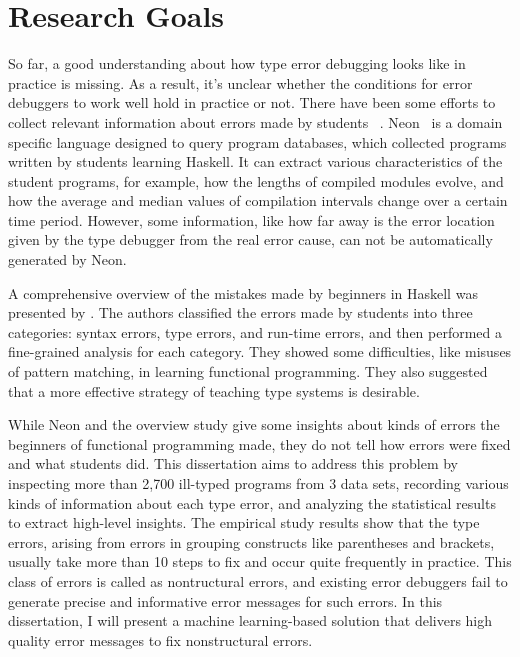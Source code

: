 \documentclass[12pt]{report}	%
\begin{document}


\section{Research Goals}

So far, a good understanding about how type error debugging looks like
in practice is missing. As a result, it's unclear whether the conditions
for error debuggers to work well hold in practice or not.
%
There have been some efforts to collect relevant
information about errors made by students
~\cite{Hage09:Neon,tirronen2015understanding,chambers2012function,fenwick2009another,denny2012all}.
Neon~\cite{Hage09:Neon} is a domain specific language designed to query
program databases, which collected programs written by students learning Haskell.
It can extract various characteristics of the student programs,
for example, how the lengths of compiled modules evolve,
and how the average and median values of compilation intervals
change over a certain time period.
However, some information, like how far away is 
the error location
given by the type debugger from the real error cause,
can not be automatically generated by Neon.

A comprehensive overview of the mistakes made by beginners in Haskell was presented by \cite{tirronen2015understanding}.
The authors classified the errors made by students into three
categories: syntax errors, type errors, and run-time errors,
and then performed a fine-grained analysis for each category.
They showed some difficulties, like misuses of pattern matching,
in learning functional programming.
They also suggested that a more effective strategy of teaching type systems
is desirable.


While Neon and the overview study give some insights about kinds of errors the beginners of
functional programming made, they do not tell how errors were fixed and what students did.
%
This dissertation aims to address this problem by inspecting more than 2,700
ill-typed programs from 3 data sets,
recording various kinds of information about each type error, 
and analyzing the statistical results to extract high-level insights.
%
The empirical study results show that the type errors, arising from errors in grouping constructs like parentheses and brackets,
usually take more than 10 steps to fix and occur quite frequently in practice.
This class of errors is called as nontructural errors,
and existing error debuggers fail to generate precise and informative error messages for such errors.
In this dissertation, I will present a machine learning-based solution that delivers high quality error messages to fix nonstructural errors.
\end{document}
